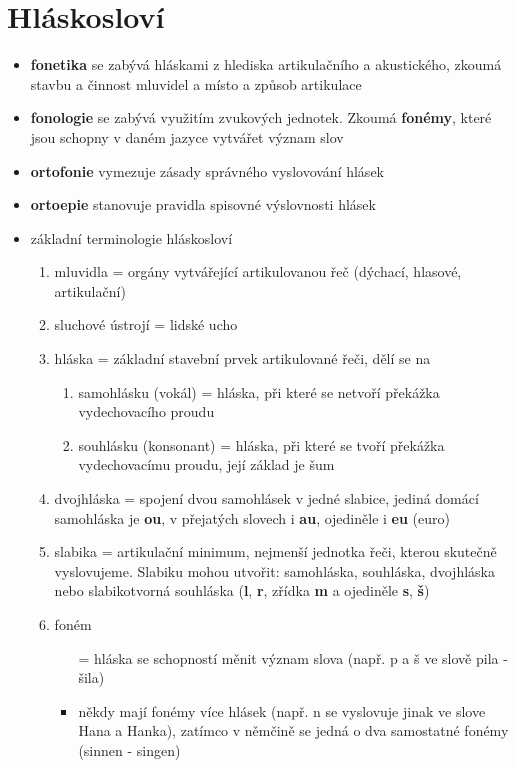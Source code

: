 \documentclass{memoir}
\begin{document}
\section*{Hláskosloví}
	\begin{itemize}
		\item \textbf{fonetika} se zabývá hláskami z hlediska artikulačního a akustického, zkoumá stavbu a činnost mluvidel a místo a způsob artikulace
		\item \textbf{fonologie} se zabývá využitím zvukových jednotek. Zkoumá \textbf{fonémy}, které jsou schopny v daném jazyce vytvářet význam slov
		\item \textbf{ortofonie} vymezuje zásady správného vyslovování hlásek
		\item \textbf{ortoepie} stanovuje pravidla spisovné výslovnosti hlásek
		\item základní terminologie hláskosloví
		\begin{enumerate}
			\item mluvidla = orgány vytvářející artikulovanou řeč (dýchací, hlasové, artikulační)
			\item sluchové ústrojí = lidské ucho
			\item hláska = základní stavební prvek artikulované řeči, dělí se na
			\begin{enumerate}
				\item samohlásku (vokál) = hláska, při které se netvoří překážka vydechovacího proudu
				\item souhlásku (konsonant) = hláska, při které se tvoří překážka vydechovacímu proudu, její základ je šum
			\end{enumerate}
			\item dvojhláska = spojení dvou samohlásek v jedné slabice, jediná domácí samohláska je \textbf{ou}, v přejatých slovech i \textbf{au}, ojediněle i \textbf{eu} (euro)
			\item slabika = artikulační minimum, nejmenší jednotka řeči, kterou skutečně vyslovujeme. Slabiku mohou utvořit: samohláska, souhláska, dvojhláska nebo slabikotvorná souhláska (\textbf{l}, \textbf{r}, zřídka \textbf{m} a ojediněle \textbf{s}, \textbf{š})
			\item foném 
			\begin{itemize}
				\item[=] hláska se schopností měnit význam slova (např. p a š ve slově pila - šila)
				\item někdy mají fonémy více hlásek (např. n se vyslovuje jinak ve slove Hana a Hanka), zatímco v němčině se jedná o dva samostatné fonémy (sinnen - singen)

\end{itemize}
\end{enumerate}
\end{itemize}
\end{document}
